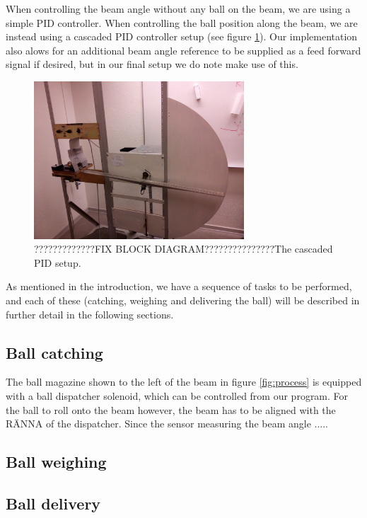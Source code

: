 When controlling the beam angle without any ball on the beam, we are using a simple PID controller. When controlling the ball position along the beam, we are instead using a cascaded PID controller setup (see figure \ref{fig:cascaded_pid}). Our implementation also alows for an additional beam angle reference to be supplied as a feed forward signal if desired, but in our final setup we do note make use of this.
\begin{figure}
\centering
\includegraphics[width=0.7\textwidth]{figures/process_fig.jpg}
\caption{?????????????FIX BLOCK DIAGRAM???????????????The cascaded PID setup.}\label{fig:cascaded_pid}
\end{figure}

As mentioned in the introduction, we have a sequence of tasks to be performed, and each of these (catching, weighing and delivering the ball) will be described in further detail in the following sections.

\subsection{Ball catching}
The ball magazine shown to the left of the beam in figure \ref{fig:process} is equipped with a ball dispatcher solenoid, which can be controlled from our program. For the ball to roll onto the beam however, the beam has to be aligned with the RÄNNA of the dispatcher. Since the sensor measuring the beam angle .....

\subsection{Ball weighing}


\subsection{Ball delivery}

